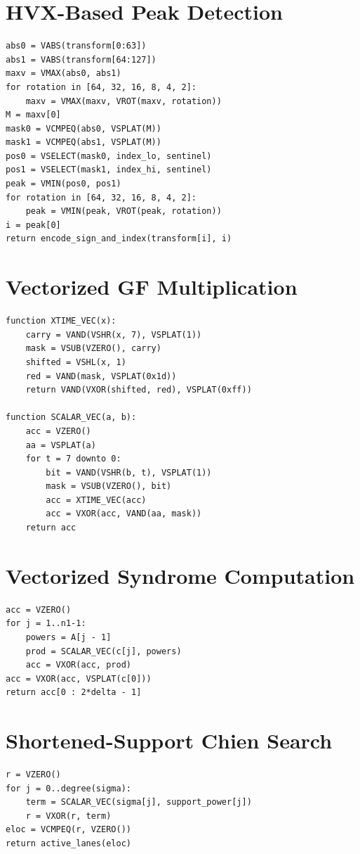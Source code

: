 \documentclass[12pt,a4paper]{report}
\begin{document}
\section{HVX-Based Peak Detection}
\begin{lstlisting}[caption={Scalar-equivalent RM peak selection.}]
abs0 = VABS(transform[0:63])
abs1 = VABS(transform[64:127])
maxv = VMAX(abs0, abs1)
for rotation in [64, 32, 16, 8, 4, 2]:
    maxv = VMAX(maxv, VROT(maxv, rotation))
M = maxv[0]
mask0 = VCMPEQ(abs0, VSPLAT(M))
mask1 = VCMPEQ(abs1, VSPLAT(M))
pos0 = VSELECT(mask0, index_lo, sentinel)
pos1 = VSELECT(mask1, index_hi, sentinel)
peak = VMIN(pos0, pos1)
for rotation in [64, 32, 16, 8, 4, 2]:
    peak = VMIN(peak, VROT(peak, rotation))
i = peak[0]
return encode_sign_and_index(transform[i], i)
\end{lstlisting}

\section{Vectorized GF Multiplication}
\begin{lstlisting}[caption={Vectorized xtime and scalar-vector multiplication.}]
function XTIME_VEC(x):
    carry = VAND(VSHR(x, 7), VSPLAT(1))
    mask = VSUB(VZERO(), carry)
    shifted = VSHL(x, 1)
    red = VAND(mask, VSPLAT(0x1d))
    return VAND(VXOR(shifted, red), VSPLAT(0xff))

function SCALAR_VEC(a, b):
    acc = VZERO()
    aa = VSPLAT(a)
    for t = 7 downto 0:
        bit = VAND(VSHR(b, t), VSPLAT(1))
        mask = VSUB(VZERO(), bit)
        acc = XTIME_VEC(acc)
        acc = VXOR(acc, VAND(aa, mask))
    return acc
\end{lstlisting}

\section{Vectorized Syndrome Computation}
\begin{lstlisting}[caption={Packed syndrome computation.}]
acc = VZERO()
for j = 1..n1-1:
    powers = A[j - 1]
    prod = SCALAR_VEC(c[j], powers)
    acc = VXOR(acc, prod)
acc = VXOR(acc, VSPLAT(c[0]))
return acc[0 : 2*delta - 1]
\end{lstlisting}

\section{Shortened-Support Chien Search}
\begin{lstlisting}[caption={Packed support-point locator evaluation.}]
r = VZERO()
for j = 0..degree(sigma):
    term = SCALAR_VEC(sigma[j], support_power[j])
    r = VXOR(r, term)
eloc = VCMPEQ(r, VZERO())
return active_lanes(eloc)
\end{lstlisting}
\end{document}
